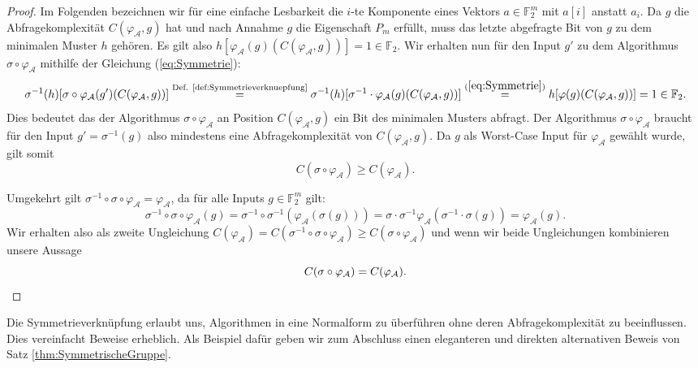 \documentclass[10pt,a4paper, footheight=1mm]{scrreprt}
\theoremstyle{definition}
\begin{document}
\begin{proof}
Im Folgenden bezeichnen wir für eine einfache Lesbarkeit die
$i$-te Komponente eines Vektors $a\in\mathbb{F}_2^m$ mit
$a[i]$ anstatt $a_i$.
Da $g$ die Abfragekomplexität $C(\varphi_\mathcal{A}, g)$
hat und nach Annahme $g$ die Eigenschaft $P_m$ erfüllt,
muss das letzte abgefragte Bit von $g$ zu dem
minimalen Muster $h$ gehören. Es gilt also 
$h[\varphi_\mathcal{A}(g)(C(\varphi_\mathcal{A}, g))]= 1 \in \mathbb{F}_2$.
Wir erhalten nun für den Input $g'$ zu dem
Algorithmus $\sigma \circ \varphi_\mathcal{A}$ mithilfe der 
Gleichung (\ref{eq:Symmetrie}):
$$\sigma^{-1}(h)[\sigma \circ \varphi_\mathcal{A}(g')(C(\varphi_\mathcal{A}, g))]
\overset{\textup{Def. \ref{def:Symmetrieverknuepfung}}}{=}
\sigma^{-1}(h)[\sigma^{-1} \cdot \varphi_\mathcal{A}(g)(C(\varphi_\mathcal{A}, g))]
\overset{(\ref{eq:Symmetrie})}{=}
h[\varphi(g)(C(\varphi_\mathcal{A}, g))]
= 1 \in \mathbb{F}_2.$$
Dies bedeutet das der Algorithmus $\sigma \circ \varphi_\mathcal{A}$ an Position
$C(\varphi_\mathcal{A}, g)$ ein Bit des minimalen Musters abfragt.
Der Algorithmus $\sigma \circ \varphi_\mathcal{A}$ braucht für den
Input $g'=\sigma^{-1}(g)$ also mindestens eine Abfragekomplexität
von $C(\varphi_\mathcal{A}, g)$. Da $g$ als Worst-Case Input für
$\varphi_\mathcal{A}$ gewählt wurde, gilt somit
$$ C(\sigma \circ \varphi_\mathcal{A}) \geq C(\varphi_\mathcal{A}).$$

Umgekehrt gilt
$\sigma^{-1}\circ \sigma \circ \varphi_\mathcal{A} = \varphi_\mathcal{A}$,
da für alle Inputs $g\in\mathbb{F}_2^m$ gilt:
$$\sigma^{-1}\circ \sigma \circ \varphi_\mathcal{A}(g)
= \sigma^{-1} \circ \sigma^{-1}(\varphi_\mathcal{A}(\sigma(g)))
= \sigma \cdot \sigma^{-1} \varphi_\mathcal{A}(\sigma^{-1}\cdot \sigma(g))
= \varphi_\mathcal{A}(g).
$$
Wir erhalten also als zweite Ungleichung
$C(\varphi_\mathcal{A}) = C(\sigma^{-1}\circ \sigma \circ \varphi_\mathcal{A})
\geq C(\sigma \circ \varphi_\mathcal{A})$
und wenn wir beide Ungleichungen kombinieren unsere Aussage
\begin{equation*}
C(\sigma \circ \varphi_\mathcal{A}) = C(\varphi_\mathcal{A}).
\qedhere
\end{equation*}
\end{proof}
Die Symmetrieverknüpfung erlaubt uns, Algorithmen
in eine Normalform zu überführen ohne deren Abfragekomplexität
zu beeinflussen. Dies vereinfacht Beweise erheblich.
Als Beispiel dafür geben wir zum Abschluss einen eleganteren und
direkten alternativen
Beweis von Satz \ref{thm:SymmetrischeGruppe}.
\end{document}
